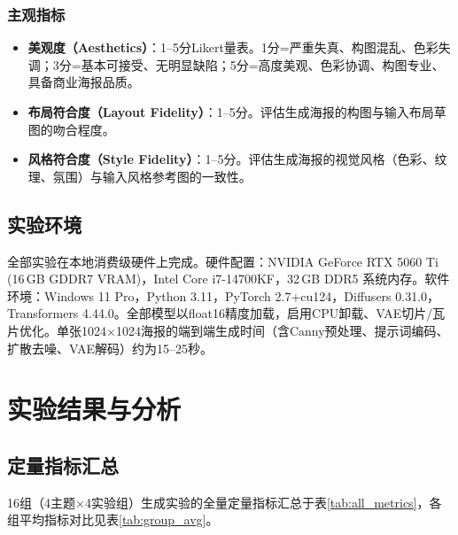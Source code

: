 \documentclass[12pt,a4paper]{ctexart}
\begin{document}
\subsubsection{主观指标}
\begin{itemize}[itemsep=2pt,topsep=4pt]
    \item \textbf{美观度（Aesthetics）}：1--5分Likert量表。1分=严重失真、构图混乱、色彩失调；3分=基本可接受、无明显缺陷；5分=高度美观、色彩协调、构图专业、具备商业海报品质。
    \item \textbf{布局符合度（Layout Fidelity）}：1--5分。评估生成海报的构图与输入布局草图的吻合程度。
    \item \textbf{风格符合度（Style Fidelity）}：1--5分。评估生成海报的视觉风格（色彩、纹理、氛围）与输入风格参考图的一致性。
\end{itemize}

\subsection{实验环境}

全部实验在本地消费级硬件上完成。硬件配置：NVIDIA GeForce RTX 5060 Ti (16\,GB GDDR7 VRAM)，Intel Core i7-14700KF，32\,GB DDR5 系统内存。软件环境：Windows 11 Pro，Python 3.11，PyTorch 2.7+cu124，Diffusers 0.31.0，Transformers 4.44.0。全部模型以float16精度加载，启用CPU卸载、VAE切片/瓦片优化。单张1024$\times$1024海报的端到端生成时间（含Canny预处理、提示词编码、扩散去噪、VAE解码）约为15--25秒。

\section{实验结果与分析}
\label{sec:results}

\subsection{定量指标汇总}

16组（4主题$\times$4实验组）生成实验的全量定量指标汇总于表\ref{tab:all_metrics}，各组平均指标对比见表\ref{tab:group_avg}。
\end{document}
